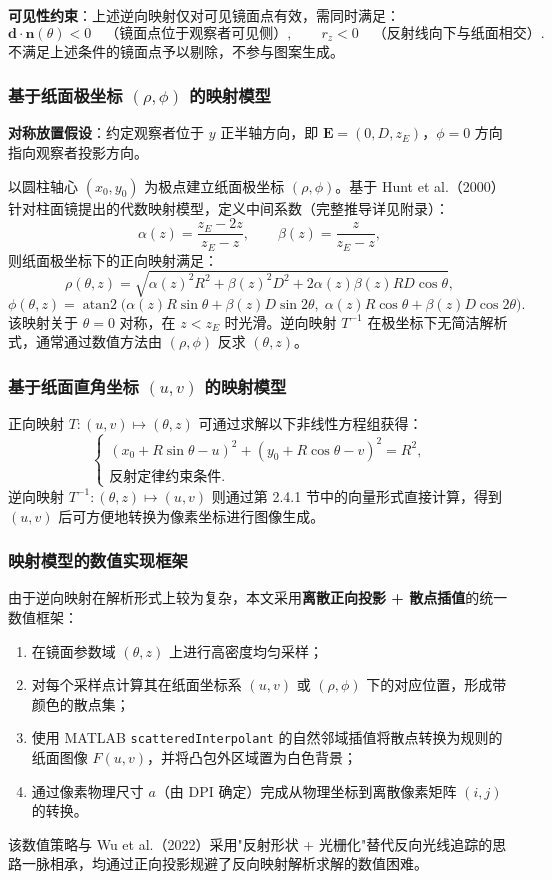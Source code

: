 \documentclass[12pt, a4paper]{ctexart}
\begin{document}
\textbf{可见性约束}：上述逆向映射仅对可见镜面点有效，需同时满足：
\[
\mathbf{d}\cdot\mathbf{n}(\theta)<0\quad\text{（镜面点位于观察者可见侧）},\qquad r_z<0\quad\text{（反射线向下与纸面相交）}.
\]
不满足上述条件的镜面点予以剔除，不参与图案生成。

\subsubsection{基于纸面极坐标 \texorpdfstring{$(\rho,\phi)$}{(rho,phi)} 的映射模型}

\textbf{对称放置假设}：约定观察者位于 $y$ 正半轴方向，即 $\mathbf{E}=(0,D,z_E)$，$\phi=0$ 方向指向观察者投影方向。

以圆柱轴心 $(x_0,y_0)$ 为极点建立纸面极坐标 $(\rho,\phi)$。基于 Hunt et al.（2000）针对柱面镜提出的代数映射模型，定义中间系数（完整推导详见附录）：
\[
\alpha(z)=\frac{z_E-2z}{z_E-z},\qquad\beta(z)=\frac{z}{z_E-z},
\]
则纸面极坐标下的正向映射满足：
\[
\rho(\theta,z)=\sqrt{\alpha(z)^2R^2+\beta(z)^2D^2+2\alpha(z)\beta(z)RD\cos\theta},
\]
\[
\phi(\theta,z)=\operatorname{atan2}\!\bigl(\alpha(z)R\sin\theta+\beta(z)D\sin2\theta,\;\alpha(z)R\cos\theta+\beta(z)D\cos2\theta\bigr).
\]
该映射关于 $\theta=0$ 对称，在 $z<z_E$ 时光滑。逆向映射 $T^{-1}$ 在极坐标下无简洁解析式，通常通过数值方法由 $(\rho,\phi)$ 反求 $(\theta,z)$。

\subsubsection{基于纸面直角坐标 \texorpdfstring{$(u,v)$}{(u,v)} 的映射模型}

正向映射 $T:(u,v)\mapsto(\theta,z)$ 可通过求解以下非线性方程组获得：
\[
\begin{cases}
(x_0+R\sin\theta-u)^2+(y_0+R\cos\theta-v)^2=R^2,\\
\text{反射定律约束条件.}
\end{cases}
\]
逆向映射 $T^{-1}:(\theta,z)\mapsto(u,v)$ 则通过第 2.4.1 节中的向量形式直接计算，得到 $(u,v)$ 后可方便地转换为像素坐标进行图像生成。

\subsubsection{映射模型的数值实现框架}

由于逆向映射在解析形式上较为复杂，本文采用\textbf{离散正向投影 + 散点插值}的统一数值框架：
\begin{enumerate}
    \item 在镜面参数域 $(\theta,z)$ 上进行高密度均匀采样；
    \item 对每个采样点计算其在纸面坐标系 $(u,v)$ 或 $(\rho,\phi)$ 下的对应位置，形成带颜色的散点集；
    \item 使用 MATLAB \texttt{scatteredInterpolant} 的自然邻域插值将散点转换为规则的纸面图像 $F(u,v)$，并将凸包外区域置为白色背景；
    \item 通过像素物理尺寸 $a$（由 DPI 确定）完成从物理坐标到离散像素矩阵 $(i,j)$ 的转换。
\end{enumerate}
该数值策略与 Wu et al.（2022）采用"反射形状 + 光栅化"替代反向光线追踪的思路一脉相承，均通过正向投影规避了反向映射解析求解的数值困难。
\end{document}
